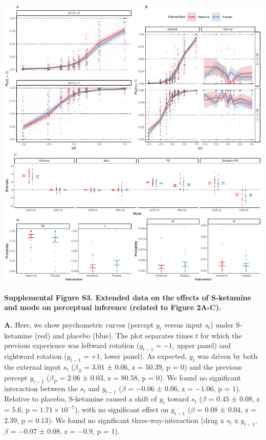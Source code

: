 \documentclass[
]{article}
\begin{document}
\includegraphics{modes_ketamine_scz_files/figure-latex/Supplemental_Figure_S3-1.pdf}

\textbf{Supplemental Figure S3. Extended data on the effects of
S-ketamine and mode on perceptual inference (related to Figure 2A-C).}

\textbf{A.} Here, we show psychometric curves (percept \(y_t\) versus
input \(s_t\)) under S-ketamine (red) and placebo (blue). The plot
separates times \(t\) for which the previous experience was leftward
rotation (\(y_{t-1} = -1\), upper panel) and rightward rotation
(\(y_{t-1} = +1\), lower panel). As expected, \(y_t\) was driven by both
the external input \(s_t\) (\(\beta_S\) = \(3.01\) ± \(0.06\), z =
\(50.39\), p = \(0\)) and the previous percept \(y_{t-1}\)
(\(\beta_{P}\) = \(2.06\) ± \(0.03\), z = \(80.58\), p = \(0\)). We
found no significant interaction between the \(s_t\) and \(y_{t-1}\)
(\(\beta\) = \(-0.06\) ± \(0.06\), z = \(-1.06\), p = \(1\)). Relative
to placebo, S-ketamine caused a shift of \(y_t\) toward \(s_t\)
(\(\beta\) = \(0.45\) ± \(0.08\), z = \(5.6\), p =
\(\ensuremath{1.71\times 10^{-7}}\)), with no significant effect on
\(y_{t-1}\) (\(\beta\) = \(0.08\) ± \(0.04\), z = \(2.39\), p =
\(0.13\)). We found no significant three-way-interaction (drug x \(s_t\)
x \(y_{t-1}\), \(\beta\) = \(-0.07\) ± \(0.08\), z = \(-0.9\), p =
\(1\)).
\end{document}
